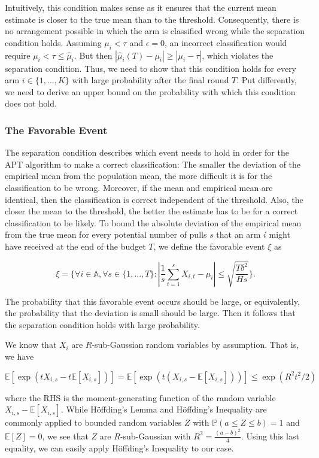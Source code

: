 \documentclass[11pt,]{article}
\begin{document}
Intuitively, this condition makes sense as it ensures that the current
mean estimate is closer to the true mean than to the threshold.
Consequently, there is no arrangement possible in which the arm is
classified wrong while the separation condition holds. Assuming
\(\mu_i < \tau\) and \(\epsilon = 0\), an incorrect classification would
require \(\mu_i < \tau \leq \hat{\mu}_i\). But then
\(| \hat{\mu}_{i}(T) - \mu_i | \geq |\mu_i - \tau|\), which violates the
separation condition. Thus, we need to show that this condition holds
for every arm \(i \in \{1,...,K\}\) with large probability after the
final round \(T\). Put differently, we need to derive an upper bound on
the probability with which this condition does not hold.

\subsubsection{The Favorable Event}\label{the-favorable-event}

The separation condition describes which event needs to hold in order
for the APT algorithm to make a correct classification: The smaller the
deviation of the empirical mean from the population mean, the more
difficult it is for the classification to be wrong. Moreover, if the
mean and empirical mean are identical, then the classification is
correct independent of the threshold. Also, the closer the mean to the
threshold, the better the estimate has to be for a correct
classification to be likely. To bound the absolute deviation of the
empirical mean from the true mean for every potential number of pulls
\(s\) that an arm \(i\) might have received at the end of the budget
\(T\), we define the favorable event \(\xi\) as

\[
\xi = \Big\{\forall i \in \mathbb{A}, \forall s \in \{1,...,T\} : |\frac{1}{s} \sum_{t=1}^{s}X_{i,t} - \mu_i| \leq \sqrt{\frac{T \delta^2}{H s}} \Big\}.
\]

The probability that this favorable event occurs should be large, or
equivalently, the probability that the deviation is small should be
large. Then it follows that the separation condition holds with large
probability.

We know that \(X_i\) are \(R\)-sub-Gaussian random variables by
assumption. That is, we have

\[
\mathbb{E}[\exp (tX_{i,s}-t\mathbb{E}[X_{i,s}])] = \mathbb{E}[\exp (t(X_{i,s}-\mathbb{E}[X_{i,s}]))] \leq \exp (R^2t^2/2)
\]

where the RHS is the moment-generating function of the random variable
\(X_{i,s}-\mathbb{E}[X_{i,s}]\). While Höffding's Lemma and Höffding's
Inequality are commonly applied to bounded random variables \(Z\) with
\(\mathbb{P}(a\leq Z \leq b) = 1\) and \(\mathbb{E}[Z] = 0\), we see
that \(Z\) are \(R\)-sub-Gaussian with \(R^2 = \frac{(a-b)^2}{4}\).
Using this last equality, we can easily apply Höffding's Inequality to
our case.
\end{document}
